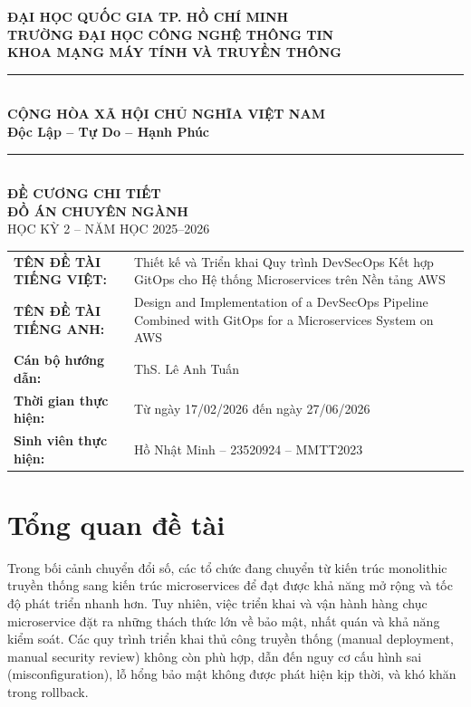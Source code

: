 \documentclass[12pt,a4paper]{article}
\begin{document}
\begin{center}
  {\large\textbf{ĐẠI HỌC QUỐC GIA TP. HỒ CHÍ MINH}}\\
  {\large\textbf{TRƯỜNG ĐẠI HỌC CÔNG NGHỆ THÔNG TIN}}\\
  {\large\textbf{KHOA MẠNG MÁY TÍNH VÀ TRUYỀN THÔNG}}\\[4pt]
  \rule{\textwidth}{0.5pt}\\[4pt]
  {\large\textbf{CỘNG HÒA XÃ HỘI CHỦ NGHĨA VIỆT NAM}}\\
  {\large\textbf{Độc Lập -- Tự Do -- Hạnh Phúc}}\\[4pt]
  \rule{\textwidth}{0.5pt}\\[16pt]

  {\LARGE\textbf{ĐỀ CƯƠNG CHI TIẾT}}\\[4pt]
  {\large\textbf{ĐỒ ÁN CHUYÊN NGÀNH}}\\[8pt]
  {\large HỌC KỲ 2 -- NĂM HỌC 2025--2026}\\[20pt]
\end{center}

\begin{longtable}{@{}p{4cm} p{12cm}@{}}
  \textbf{TÊN ĐỀ TÀI TIẾNG VIỆT:} &
  Thiết kế và Triển khai Quy trình DevSecOps Kết hợp GitOps cho Hệ thống Microservices trên Nền tảng AWS \\[6pt]

  \textbf{TÊN ĐỀ TÀI TIẾNG ANH:} &
  Design and Implementation of a DevSecOps Pipeline Combined with Git\-Ops for a Microservices System on AWS \\[6pt]

  \textbf{Cán bộ hướng dẫn:} &
  ThS. Lê Anh Tuấn \\[6pt]

  \textbf{Thời gian thực hiện:} &
  Từ ngày 17/02/2026 đến ngày 27/06/2026 \\[6pt]

  \textbf{Sinh viên thực hiện:} &
  Hồ Nhật Minh -- 23520924 -- MMTT2023 \\[6pt]
\end{longtable}

\vspace{12pt}

\section{Tổng quan đề tài}

Trong bối cảnh chuyển đổi số, các tổ chức đang chuyển từ kiến trúc monolithic truyền thống sang kiến trúc microservices để đạt được khả năng mở rộng và tốc độ phát triển nhanh hơn. Tuy nhiên, việc triển khai và vận hành hàng chục microservice đặt ra những thách thức lớn về bảo mật, nhất quán và khả năng kiểm soát. Các quy trình triển khai thủ công truyền thống (manual deployment, manual security review) không còn phù hợp, dẫn đến nguy cơ cấu hình sai (misconfiguration), lỗ hổng bảo mật không được phát hiện kịp thời, và khó khăn trong rollback.
\end{document}
